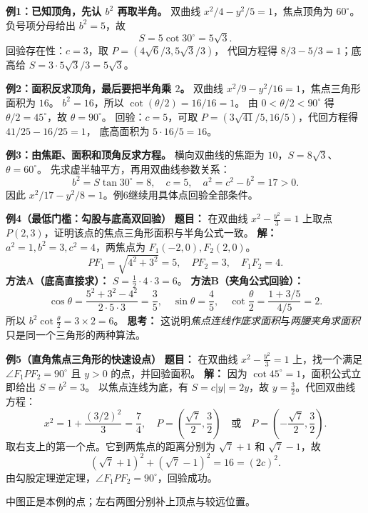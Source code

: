 \clearpage
\begin{examplebox}
\textbf{\textcolor{CExample}{例1：已知顶角，先认 $b^2$ 再取半角。}}
双曲线 $x^2/4-y^2/5=1$，焦点顶角为 $60^\circ$。
负号项分母给出 $b^2=5$，故
\[
 S=5\cot30^\circ=\boxed{5\sqrt3}.
\]
回验存在性：$c=3$，取 $P=(4\sqrt6/3,5\sqrt3/3)$，
代回方程得 $8/3-5/3=1$；底高给 $S=3\cdot5\sqrt3/3=5\sqrt3$。

\medskip
\textbf{\textcolor{CExample}{例2：面积反求顶角，最后要把半角乘 $2$。}}
双曲线 $x^2/9-y^2/16=1$，焦点三角形面积为 $16$。
$b^2=16$，所以 $\cot(\theta/2)=16/16=1$。
由 $0<\theta/2<90^\circ$ 得 $\theta/2=45^\circ$，故 $\boxed{\theta=90^\circ}$。
回验：$c=5$，可取 $P=(3\sqrt{41}/5,16/5)$，代回方程得 $41/25-16/25=1$，
底高面积为 $5\cdot16/5=16$。

\medskip
\textbf{\textcolor{CExample}{例3：由焦距、面积和顶角反求方程。}}
横向双曲线的焦距为 $10$，$S=8\sqrt3$、$\theta=60^\circ$。
先求虚半轴平方，再用双曲线参数关系：
\[
 b^2=S\tan30^\circ=8,\quad c=5,\quad a^2=c^2-b^2=17>0.
\]
因此 $\boxed{x^2/17-y^2/8=1}$。例6继续用具体点回验全部条件。

\medskip
\textbf{\textcolor{CExample}{例4（最低门槛：勾股与底高双回验）}}
\textbf{题目：} 在双曲线 $x^2-\frac{y^2}{3}=1$ 上取点 $P(2,3)$，证明该点的焦点三角形面积与半角公式一致。
\textbf{解：} $a^2=1,b^2=3,c^2=4$，两焦点为 $F_1(-2,0),F_2(2,0)$。
\[
PF_1=\sqrt{4^2+3^2}=5,\quad PF_2=3,\quad F_1F_2=4.
\]
\textbf{方法A（底高直接求）：} $S=\frac12\cdot4\cdot3=6$。
\textbf{方法B（夹角公式回验）：}
\[
\cos\theta=\frac{5^2+3^2-4^2}{2\cdot5\cdot3}=\frac35,
\quad \sin\theta=\frac45,
\quad\cot\frac\theta2=\frac{1+3/5}{4/5}=2.
\]
所以 $b^2\cot\frac\theta2=3\times2=6$。
\textbf{思考：} 这说明\emph{焦点连线作底求面积}与\emph{两腰夹角求面积}只是同一个三角形的两种算法。

\medskip
\end{examplebox}
\clearpage
\begin{examplebox}
\textbf{\textcolor{CExample}{例5（直角焦点三角形的快速设点）}}
\textbf{题目：} 在双曲线 $x^2-\frac{y^2}{3}=1$ 上，找一个满足 $\angle F_1PF_2=90^\circ$ 且 $y>0$ 的点，并回验面积。
\textbf{解：} 因为 $\cot45^\circ=1$，面积公式立即给出 $S=b^2=3$。
以焦点连线为底，有 $S=c|y|=2y$，故 $y=\frac32$。代回双曲线方程：
\[
x^2=1+\frac{(3/2)^2}{3}=\frac74,
\quad P=\left(\frac{\sqrt7}{2},\frac32\right)
\quad\text{或}\quad
P=\left(-\frac{\sqrt7}{2},\frac32\right).
\]
取右支上的第一个点。它到两焦点的距离分别为 $\sqrt7+1$ 和 $\sqrt7-1$，故
\[
(\sqrt7+1)^2+(\sqrt7-1)^2=16=(2c)^2.
\]
由勾股定理逆定理，$\angle F_1PF_2=90^\circ$，回验成功。

中图正是本例的点；左右两图分别补上顶点与较远位置。

\medskip
\end{examplebox}
